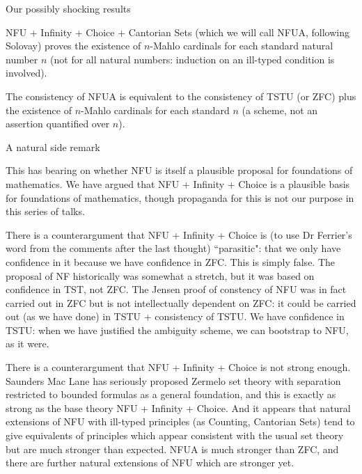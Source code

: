 \documentclass{slides}
\begin{document}
\begin{slide}

{\Large Our possibly shocking results}

NFU + Infinity + Choice + Cantorian Sets (which we will call NFUA, following Solovay) proves the existence of $n$-Mahlo cardinals for each standard natural number $n$ (not for all natural numbers:  induction on an ill-typed condition is involved).

The consistency of NFUA is equivalent to the consistency of TSTU (or ZFC) plus the existence of $n$-Mahlo cardinals for each standard $n$ (a scheme, not an assertion quantified over $n$).


\end{slide}

\begin{slide}
 {\Large A natural side remark}

This has bearing on whether NFU is itself a plausible proposal for foundations of mathematics.  We have argued that NFU + Infinity + Choice is a plausible basis for foundations of mathematics, though propaganda for this is not our purpose in this series of talks.

\end{slide}

\begin{slide}

There is a counterargument that NFU + Infinity + Choice is (to use Dr Ferrier's word from the comments after the last thought) ``parasitic":  that we only have confidence in it because we have confidence in ZFC.  This is simply false.  The proposal of NF historically was somewhat a stretch, but it was based on confidence in TST, not ZFC.  The Jensen proof of
constency of NFU was in fact carried out in ZFC but is not intellectually dependent on ZFC:  it could be carried out (as we have done) in TSTU + consistency of TSTU.  We have confidence in TSTU:  when we have justified the ambiguity scheme, we can bootstrap to NFU, as it were.

\end{slide}

\begin{slide}

There is a counterargument that NFU + Infinity + Choice is not strong enough.  Saunders Mac Lane has seriously proposed Zermelo set theory with separation restricted to bounded formulas as a general foundation, and this is exactly as strong as the base theory NFU + Infinity + Choice.  And it appears that natural extensions of NFU with ill-typed principles (as Counting, Cantorian Sets) tend to give equivalents of principles which appear consistent with the usual set theory but are much stronger than expected.  NFUA is much stronger than ZFC, and there are further natural extensions of NFU which are stronger yet.


\end{slide}
\end{document}
